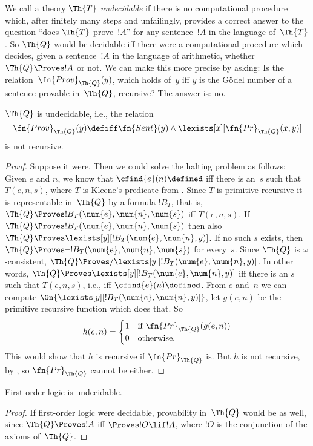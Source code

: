 \documentclass[../../include/open-logic-section]{subfiles}
\begin{document}

We call a theory $\Th{T}$ \emph{undecidable} if there is no
computational procedure which, after finitely many steps and
unfailingly, provides a correct answer to the question ``does $\Th{T}$
prove~$!A$'' for any sentence~$!A$ in the language of~$\Th{T}$.  So
$\Th{Q}$ would be decidable iff there were a computational procedure
which decides, given a sentence~$!A$ in the language of arithmetic,
whether $\Th{Q} \Proves !A$ or not.  We can make this more precise by
asking: Is the relation~$\fn{Prov}_{\Th{Q}}(y)$, which holds of~$y$
iff $y$ is the G\"odel number of a sentence provable in~$\Th{Q}$,
recursive?  The answer is: no. 

\begin{thm}
$\Th{Q}$ is undecidable, i.e., the relation 
\[
\fn{Prov}_{\Th{Q}}(y) \defiff \fn{Sent}(y) \land
\lexists[x][\fn{Pr}_{\Th{Q}}(x, y)]
\]
is not recursive.
\end{thm}

\begin{proof}
Suppose it were.  Then we could solve the halting problem as follows:
Given $e$ and $n$, we know that $\cfind{e}(n) \defined$ iff there is
an~$s$ such that $T(e, n, s)$, where $T$ is Kleene's predicate from
. Since $T$ is primitive recursive
it is representable in~$\Th{Q}$ by a formula $!B_T$, that is, $\Th{Q}
\Proves !B_T(\num{e}, \num{n}, \num{s})$ iff $T(e, n, s)$.  If $\Th{Q}
\Proves !B_T(\num{e}, \num{n}, \num{s})$ then also $
\Th{Q} \Proves \lexists[y][!B_T(\num{e}, \num{n}, y)]$. If no such $s$
exists, then $\Th{Q} \Proves \lnot !B_T(\num{e}, \num{n}, \num{s})$
for every~$s$. Since $\Th{Q}$ is $\omega$-consistent, $\Th{Q} \Proves/
\lexists[y][!B_T(\num{e}, \num{n}, y)]$.  In other words,
$\Th{Q} \Proves \lexists[y][!B_T(\num{e}, \num{n}, y)]$ iff
there is an $s$ such that $T(e, n, s)$, i.e., iff $\cfind{e}(n)
\defined$.  From $e$ and~$n$ we can compute
$\Gn{\lexists[y][!B_T(\num{e}, \num{n}, y)]}$, let $g(e, n)$
be the primitive recursive function which does that. So
\[
h(e, n) = 
\begin{cases}
1 & \text{if $\fn{Pr}_{\Th{Q}}(g(e, n))$}\\
0 & \text{otherwise}.
\end{cases}
\]
This would show that $h$ is recursive if $\fn{Pr}_{\Th{Q}}$ is. But
$h$ is not recursive, by ,
so $\fn{Pr}_{\Th{Q}}$ cannot be either.
\end{proof}

\begin{cor}
First-order logic is undecidable.
\end{cor}

\begin{proof}
If first-order logic were decidable, provability in~$\Th{Q}$ would be
as well, since $\Th{Q} \Proves !A$ iff $\Proves !O \lif !A$, where
$!O$ is the conjunction of the axioms of~$\Th{Q}$.
\end{proof}
\end{document}
